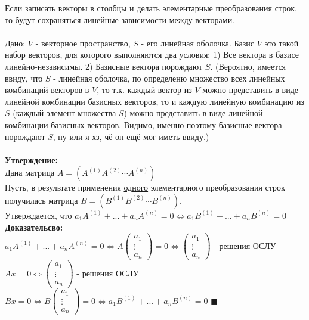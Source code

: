 \documentclass[a4paper,11pt]{report}
\begin{document}
Если записать векторы в столбцы и делать элементарные преобразования строк, то будут сохраняться линейные зависимости между векторами.\\
\\
Дано: $V$ - векторное пространство, $S$ - его линейная оболочка.
Базис $V$ это такой набор векторов, для которого выполняются два условия:
1) Все вектора в базисе линейно-независимы.
2) Базисные вектора порождают $S$. (Вероятно, имеется ввиду, что $S$ - линейная оболочка, по определеню множество всех 
линейных комбинаций векторов в $V$, то т.к. каждый вектор из $V$ можно представить в виде линейной комбинации
базисных векторов, то и каждую линейную комбинацию из $S$ (каждый элемент множества $S$) можно представить в виде 
линейной комбинации базисных векторов. Видимо, именно поэтому базисные вектора порождают $S$, ну или я хз, чё он ещё мог иметь ввиду.)\\
\\
\textbf{Утверждение:} \\
Дана матрица $A =  (A^{(1)} A^{(2)} \cdots  A^{(n)})$\\
Пусть, в результате применения \underline{одного} элементарного преобразования строк получилась матрица $B = (B^{(1)} B^{(2)} \cdots  B^{(n)})$.\\
Утверждается, что $a_1A^{(1)} + ... + a_nA^{(n)} = 0 \Leftrightarrow a_1B^{(1)} + ... + a_nB^{(n)} = 0$\\
\textbf{Доказательсво:} \\
$a_1A^{(1)} + ... + a_nA^{(n)} = 0 \Leftrightarrow A
\begin{pmatrix}
a_1\\
\vdots\\
a_n
\end{pmatrix}
= 0
\Leftrightarrow 
\begin{pmatrix}
a_1\\
\vdots\\
a_n
\end{pmatrix}
$ - решения ОСЛУ $Ax = 0 \Leftrightarrow
\begin{pmatrix}
a_1\\
\vdots\\
a_n
\end{pmatrix}
$ - решения ОСЛУ $Bx = 0 \Leftrightarrow B
\begin{pmatrix}
a_1\\
\vdots\\
a_n
\end{pmatrix}
= 0 \Leftrightarrow a_1B^{(1)} + ... + a_nB^{(n)} = 0
$ $ \blacksquare$\\
\end{document}
